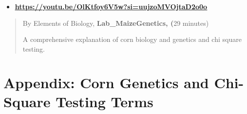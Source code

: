 \documentclass[
  letterpaper,
  DIV=11,
  numbers=noendperiod]{scrreprt}
\providecommand{\tightlist}{%
  \setlength{\itemsep}{0pt}\setlength{\parskip}{0pt}}
\begin{document}
\begin{itemize}
\tightlist
\item
  \href{https://youtu.be/OlKtfoy6V5w?si=uujzoMVOjtaD2o0o}{\textbf{\ul{https://youtu.be/OlKtfoy6V5w?si=uujzoMVOjtaD2o0o}}}
\end{itemize}

\begin{quote}
By Elements of Biology, \textbf{Lab\_MaizeGenetics, (}29 minutes)

A comprehensive explanation of corn biology and genetics and chi square
testing.
\end{quote}

\section{\texorpdfstring{\textbf{Appendix: Corn Genetics and Chi-Square
Testing
Terms}}{Appendix: Corn Genetics and Chi-Square Testing Terms}}\label{appendix-corn-genetics-and-chi-square-testing-terms}
\end{document}
